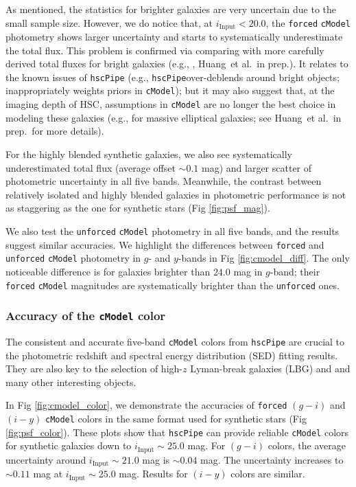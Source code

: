 \documentclass[useamsfonts]{pasj01}
\def\etal{{\ et al.~}}
\def\hscpipe{\texttt{hscPipe}}
\def\cmodel{\texttt{cModel}}
\def\forced{\texttt{forced}}
\def\unforced{\texttt{unforced}}
\begin{document}
    As mentioned, the statistics for brighter galaxies are very uncertain due to the
    small sample size. 
    However, we do notice that, at $i_{\mathrm{Input}}<20.0$, the \forced{} 
    \cmodel{} photometry shows larger uncertainty and starts to systematically 
    underestimate the total flux.  
    This problem is confirmed via comparing with more carefully derived total fluxes 
    for bright galaxies (e.g., \citealt{HSCDR1}, Huang\etal in prep.). 
    It relates to the known issues of \hscpipe{} (e.g., \hscpipe{}over-deblends around bright objects; inappropriately weights priors in \cmodel{}); but it may also suggest
    that, at the imaging depth of HSC, assumptions in \cmodel{} are no longer the 
    best choice in modeling these galaxies (e.g., for massive elliptical galaxies; 
    see Huang\etal in prep.~for more details). 
    
    For the highly blended synthetic galaxies, we also see systematically 
    underestimated total flux (average offset ${\sim}0.1$ mag) and larger scatter 
    of photometric uncertainty in all five bands.  
    Meanwhile, the contrast between relatively isolated and highly blended galaxies 
    in photometric performance is not as staggering as the one for synthetic
    stars (Fig \ref{fig:psf_mag}).
    
    We also test the \unforced{} \cmodel{} photometry in all five bands, and the 
    results suggest similar accuracies.
    We highlight the differences between \forced{} and \unforced{} \cmodel{} 
    photometry in $g$- and $y$-bands in Fig \ref{fig:cmodel_diff}.
    The only noticeable difference is for galaxies brighter than $24.0$ mag in 
    $g$-band; their \forced{} \cmodel{} magnitudes are systematically brighter than 
    the \unforced{} ones. 
 
\subsubsection{Accuracy of the \cmodel{} color}

    The consistent and accurate five-band \cmodel{} colors from \hscpipe{} are crucial 
    to the photometric redshift and spectral energy distribution (SED) fitting results. 
    They are also key to the selection of high-$z$ Lyman-break galaxies (LBG) and 
    and many other interesting objects. 

    In Fig \ref{fig:cmodel_color}, we demonstrate the accuracies of \forced{} $(g-i)$
    and $(i-y)$ \cmodel{} colors in the same format used for synthetic stars 
    (Fig \ref{fig:psf_color}).
    These plots show that \hscpipe{} can provide reliable \cmodel{} colors for 
    synthetic galaxies down to $i_{\mathrm{Input}}{\sim}25.0$ mag. 
    For $(g-i)$ colors, the average uncertainty around $i_{\mathrm{Input}}{\sim}21.0$ mag 
    is ${\sim}0.04$ mag.
    The uncertainty increases to ${\sim}0.11$ mag at $i_{\mathrm{Input}}{\sim}25.0$ mag.
    Results for $(i-y)$ colors are similar.
    
\end{document}
